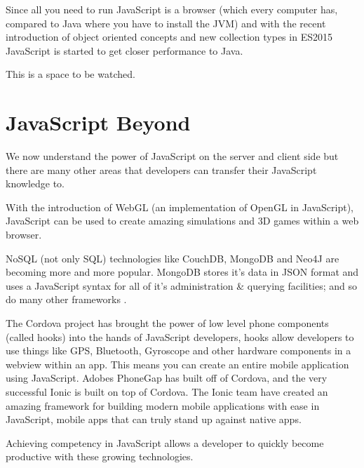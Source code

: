 \documentclass[12pt]{article} %
\begin{document}
Since all you need to run JavaScript is a browser (which every computer has, compared to Java where you have to install the JVM) and with the recent introduction of object oriented concepts and new collection types in ES2015 JavaScript is started to get closer performance to Java.

This is a space to be watched.

\section{JavaScript Beyond} %
We now understand the power of JavaScript on the server and client side but there are many other areas that developers can transfer their JavaScript knowledge to.

With the introduction of WebGL (an implementation of OpenGL in JavaScript), JavaScript can be used to create amazing simulations and 3D games within a web browser.

NoSQL (not only SQL) technologies like CouchDB, MongoDB and Neo4J are becoming more and more popular. MongoDB stores it's data in JSON format and uses a JavaScript syntax for all of it's administration \& querying facilities; and so do many other frameworks \cite{1}.

The Cordova project has brought the power of low level phone components (called hooks) into the hands of JavaScript developers, hooks allow developers to use things like GPS, Bluetooth, Gyroscope and other hardware components in a webview within an app. This means you can create an entire mobile application using JavaScript. Adobes PhoneGap has built off of Cordova, and the very successful Ionic is built on top of Cordova.
The Ionic team have created an amazing framework for building modern mobile applications with ease in JavaScript, mobile apps that can truly stand up against native apps.

Achieving competency in JavaScript allows a developer to quickly become productive with these growing technologies.



\end{document}
